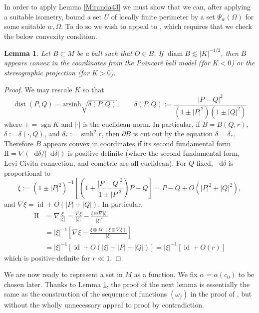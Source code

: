 \documentclass[reqno,10pt]{amsart}
\DeclareMathOperator{\diam}{diam}
\DeclareMathOperator{\id}{id}
\DeclareMathOperator{\sgn}{sgn}
\newcommand{\tr}{\operatorname{tr}}
\newcommand*\dif{\mathop{}\!\mathrm{d}}
\DeclareMathOperator{\dist}{dist}
\newcommand{\Two}{\mathrm{I\!I}}
\newtheorem{lemma}[theorem]{Lemma}
\theoremstyle{definition}
\numberwithin{equation}{section}
\begin{document}
In order to apply Lemma \ref{Miranda43} we must show that we can, after applying a suitable isometry, bound a set $U$ of locally finite perimeter by a set $\Psi_w(\Omega)$ for some suitable $w, \Omega$.
To do so we wish to appeal to \cite[Theorem 4.8]{Giusti77}, which requires that we check the below convexity condition.

\begin{lemma}\label{convex balls}
Let $B \subset M$ be a ball such that $O \in B$.
If $\diam B \lesssim |K|^{-1/2}$, then $B$ appears convex in the coordinates from the Poincar\'e ball model (for $K < 0$) or the stereographic projection (for $K > 0$).
\end{lemma}
\begin{proof}
We may rescale $K$ so that
$$\dist(P, Q) = \mathrm{arsinh} \sqrt{\delta(P, Q)}, \qquad \delta(P, Q) := \frac{|P - Q|^2}{(1 \pm |P|^2)(1 \pm |Q|^2)}$$
where $\pm = \sgn K$ and $|\cdot|$ is the euclidean norm.
In particular, if $B = B(Q, r)$, $\delta := \delta(\cdot, Q)$, and $\delta_* := \sinh^2 r$, then $\partial B$ is cut out by the equation $\delta = \delta_*$.
Therefore $B$ appears convex in coordinates if its second fundamental form $\Two = \nabla(\dif \delta/|\dif \delta|)$ is positive-definite (where the second fundamental form, Levi-Civita connection, and cometric are all euclidean).
For $Q$ fixed, $\dif \delta$ is proportional to 
$$\xi := (1 \pm |P|^2)^{-1} \left[\left(1 + \frac{|P - Q|^2}{1 \pm |P|^2}\right)P - Q\right] = P - Q + O(|P|^2 + |Q|^2),$$
and $\nabla \xi = \id + O(|P| + |Q|)$.
In particular,
\begin{align*}
\Two &= \nabla\frac{\xi}{|\xi|} = \frac{\nabla \xi}{|\xi|} - \frac{\xi \otimes \nabla|\xi|}{|\xi|^2} \\
&= |\xi|^{-1} \left[\nabla \xi - \frac{\xi \otimes \tr(\xi \otimes \nabla \xi)}{|\xi|}\right] \\
&= |\xi|^{-1} [\id + O(|\xi| + |P| + |Q|)] = |\xi|^{-1} [\id + O(r)]
\end{align*}
which is positive-definite for $r \ll 1$.
\end{proof}

We are now ready to represent a set in $M$ as a function.
We fix $\alpha = \alpha(c_0)$ to be chosen later.
Thanks to Lemma \ref{convex balls}, the proof of the next lemma is essentially the same as the construction of the sequence of functions $(\omega_j)$ in the proof of \cite[Lemma 6.4]{Giusti77}, but without the wholly unnecessary appeal to proof by contradiction.
\end{document}
